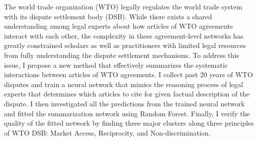 The world trade organization (WTO) legally regulates the world trade system with its dispute settlement body (DSB).
While there exists a shared understanding among legal experts about how articles of WTO agreements interact with each other,
the complexity in these agreement-level networks has greatly constrained scholars as well as practitioners with limited legal resources from fully understanding the dispute settlement mechanisms. 
To address this issue, I propose a new method that effectively summarizes the systematic interactions between articles of WTO agreements.
I collect past 20 years of WTO disputes and train a neural network that mimics the reasoning process of legal experts that determines which articles to cite for given factual description of the dispute.
I then investigated all the predictions from the trained neural network and fitted the summarization network using Random Forest.
Finally, I verify the quality of the fitted network %
by finding three major clusters along three principles of WTO DSB: Market Access, Reciprocity, and Non-discrimination.

